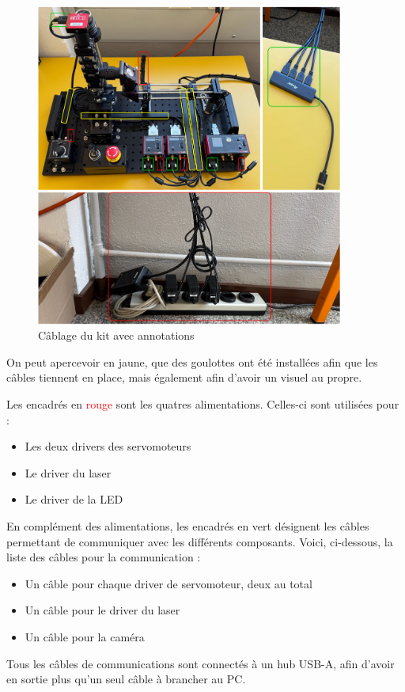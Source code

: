 \begin{figure}[H]
    \begin{center}
        \includegraphics[width=0.9\textwidth]{assets/figures/Cablage_du_kit/Cablage_annote.png}
    \end{center}
    \caption{Câblage du kit avec annotations}
    \label{cablage_kit_annoté}
\end{figure}

On peut apercevoir en \textcolor[RGB]{230, 230, 0}{jaune}, que des goulottes ont été installées afin que les câbles tiennent en place, mais également afin d'avoir un visuel au propre.

Les encadrés en \textcolor{red}{rouge} sont les quatres alimentations. Celles-ci sont utilisées pour :
\begin{itemize}
    \item Les deux drivers des servomoteurs
    \item Le driver du laser
    \item Le driver de la LED
\end{itemize}
\vspace{0.5em}
En complément des alimentations, les encadrés en \textcolor[RGB]{0, 201, 18}{vert} désignent les câbles permettant de communiquer avec les différents composants. Voici, ci-dessous, la liste des câbles pour la communication :
\begin{itemize}
    \item Un câble pour chaque driver de servomoteur, deux au total
    \item Un câble pour le driver du laser
    \item Un câble pour la caméra
\end{itemize}
\vspace{0.5em}
Tous les câbles de communications sont connectés à un hub USB-A, afin d'avoir en sortie plus qu'un seul câble à brancher au PC.